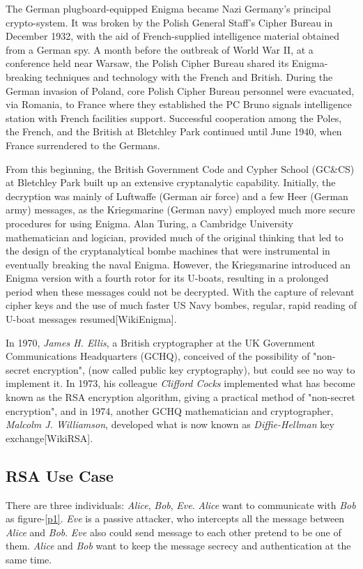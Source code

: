 \documentclass[twoside]{article}
\renewcommand{\cite}[1]{[#1]}
\begin{document}
The German plugboard-equipped Enigma became Nazi Germany's principal crypto-system. It was broken by the Polish General Staff's Cipher Bureau in December 1932, with the aid of French-supplied intelligence material obtained from a German spy. A month before the outbreak of World War II, at a conference held near Warsaw, the Polish Cipher Bureau shared its Enigma-breaking techniques and technology with the French and British. During the German invasion of Poland, core Polish Cipher Bureau personnel were evacuated, via Romania, to France where they established the PC Bruno signals intelligence station with French facilities support. Successful cooperation among the Poles, the French, and the British at Bletchley Park continued until June 1940, when France surrendered to the Germans.

From this beginning, the British Government Code and Cypher School (GC\&CS) at Bletchley Park built up an extensive cryptanalytic capability. Initially, the decryption was mainly of Luftwaffe (German air force) and a few Heer (German army) messages, as the Kriegsmarine (German navy) employed much more secure procedures for using Enigma. Alan Turing, a Cambridge University mathematician and logician, provided much of the original thinking that led to the design of the cryptanalytical bombe machines that were instrumental in eventually breaking the naval Enigma. However, the Kriegsmarine introduced an Enigma version with a fourth rotor for its U-boats, resulting in a prolonged period when these messages could not be decrypted. With the capture of relevant cipher keys and the use of much faster US Navy bombes, regular, rapid reading of U-boat messages resumed\cite{WikiEnigma}.


In 1970, \textit{James H. Ellis}, a British cryptographer at the UK Government 
Communications Headquarters (GCHQ), conceived of the possibility of 
"non-secret encryption", (now called public key cryptography), but could 
see no way to implement it. In 1973, his colleague \textit{Clifford Cocks} 
implemented what has become known as the RSA encryption algorithm, 
giving a practical method of "non-secret encryption", and in 1974, 
another GCHQ mathematician and cryptographer, \textit{Malcolm J. Williamson}, 
developed what is now known as \textit{{Diffie-Hellman}} key exchange\cite{WikiRSA}.

\subsection{RSA Use Case}
There are three individuals: \textit{Alice}, \textit{Bob}, \textit{Eve}.  
\textit{Alice} want to communicate with \textit{Bob} as figure-\ref{p1}.
\textit{Eve} is a passive attacker, who intercepts all the message between \textit{Alice}
and \textit{Bob}. \textit{Eve} also could send message to each other pretend to be one of them.
\textit{Alice} and \textit{Bob} want to keep the message secrecy and authentication
at the same time.
\end{document}
